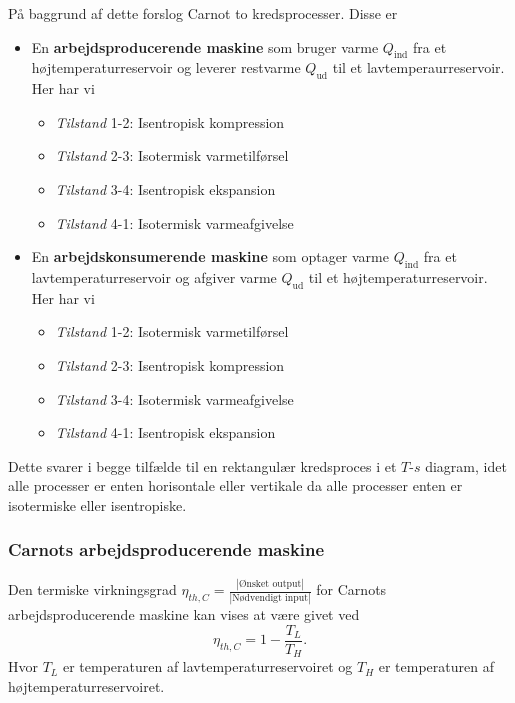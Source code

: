 På baggrund af dette forslog Carnot to kredsprocesser. Disse er
\begin{itemize}
\item En \textbf{arbejdsproducerende maskine} som bruger varme $Q_{\mathrm{ind}}$ fra et højtemperaturreservoir og leverer restvarme $Q_{\mathrm{ud}}$ til et lavtemperaurreservoir. Her har vi
  \begin{itemize}
  \item \textit{Tilstand} 1-2: Isentropisk kompression
  \item \textit{Tilstand} 2-3: Isotermisk varmetilførsel
  \item \textit{Tilstand} 3-4: Isentropisk ekspansion
  \item \textit{Tilstand} 4-1: Isotermisk varmeafgivelse
  \end{itemize}
\item En \textbf{arbejdskonsumerende maskine} som optager varme $Q_{\mathrm{ind}}$ fra et lavtemperaturreservoir og afgiver varme $Q_{\mathrm{ud}}$ til et højtemperaturreservoir. Her har vi
  \begin{itemize}
    \item \textit{Tilstand} 1-2: Isotermisk varmetilførsel
    \item \textit{Tilstand} 2-3: Isentropisk kompression
    \item \textit{Tilstand} 3-4: Isotermisk varmeafgivelse
    \item \textit{Tilstand} 4-1: Isentropisk ekspansion
  \end{itemize}
\end{itemize}
Dette svarer i begge tilfælde til en rektangulær kredsproces i et $T$-$s$ diagram, idet alle processer er enten horisontale eller vertikale da alle processer enten er isotermiske eller isentropiske.

\subsubsection{Carnots arbejdsproducerende maskine}
Den termiske virkningsgrad $\eta_{th,C} = \frac{\left| \text{Ønsket output} \right|}{\left| \text{Nødvendigt input} \right|}$ for Carnots arbejdsproducerende maskine kan vises at være givet ved
\[ 
\eta_{th,C} = 1 - \frac{T_L}{T_H}
.\]
Hvor $T_L$ er temperaturen af lavtemperaturreservoiret og $T_H$ er temperaturen af højtemperaturreservoiret. 

